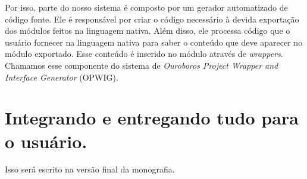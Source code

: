     
    Por isso, parte do nosso sistema é composto por um gerador automatizado de código fonte.
    Ele é responsável por criar o código necessário à devida exportação dos módulos 
    feitos na linguagem nativa. Além disso, ele processa código que o usuário fornecer na
    linguagem nativa para saber o conteúdo que deve aparecer no módulo exportado.
    Esse conteúdo é inserido no módulo através de \emph{wrappers}. Chamamos esse componente
    do sistema de \emph{Ouroboros Project Wrapper and Interface Generator} (OPWIG).
  
  
  \section{Integrando e entregando tudo para o usuário.}
  \label{sec:estrutura:integration}

    Isso será escrito na versão final da monografia.
